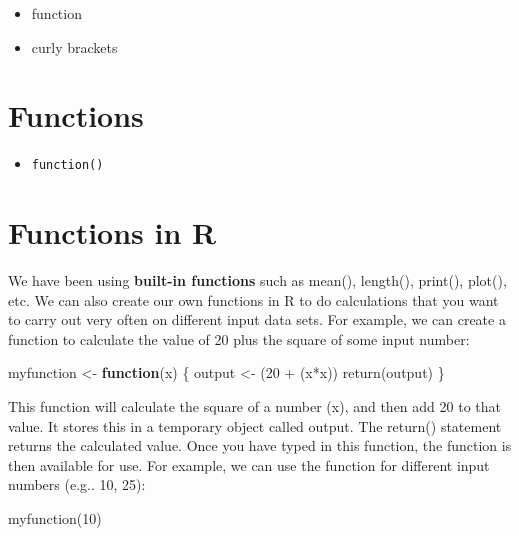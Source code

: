 \documentclass[
]{book}
\newenvironment{Shaded}{\begin{snugshade}}{\end{snugshade}}
\newcommand{\ControlFlowTok}[1]{\textcolor[rgb]{0.13,0.29,0.53}{\textbf{#1}}}
\newcommand{\DecValTok}[1]{\textcolor[rgb]{0.00,0.00,0.81}{#1}}
\newcommand{\FunctionTok}[1]{\textcolor[rgb]{0.00,0.00,0.00}{#1}}
\newcommand{\NormalTok}[1]{#1}
\newcommand{\OtherTok}[1]{\textcolor[rgb]{0.56,0.35,0.01}{#1}}
\newcommand{\SpecialCharTok}[1]{\textcolor[rgb]{0.00,0.00,0.00}{#1}}
\providecommand{\tightlist}{%
  \setlength{\itemsep}{0pt}\setlength{\parskip}{0pt}}
\begin{document}
\begin{itemize}
\tightlist
\item
  function
\item
  curly brackets
\end{itemize}

\hypertarget{functions-2}{%
\section{Functions}\label{functions-2}}

\begin{itemize}
\tightlist
\item
  \texttt{function()}
\end{itemize}

\hypertarget{functions-in-r}{%
\section{Functions in R}\label{functions-in-r}}

We have been using \textbf{built-in functions} such as mean(), length(), print(), plot(), etc. We can also create our own functions in R to do calculations that you want to carry out very often on different input data sets. For example, we can create a function to calculate the value of 20 plus the square of some input number:

\begin{Shaded}
\begin{Highlighting}[]
\NormalTok{myfunction }\OtherTok{\textless{}{-}} \ControlFlowTok{function}\NormalTok{(x) \{ }
\NormalTok{  output }\OtherTok{\textless{}{-}}\NormalTok{ (}\DecValTok{20} \SpecialCharTok{+}\NormalTok{ (x}\SpecialCharTok{*}\NormalTok{x)) }
  \FunctionTok{return}\NormalTok{(output)}
\NormalTok{  \}}
\end{Highlighting}
\end{Shaded}

This function will calculate the square of a number (x), and then add 20 to that value. It stores this in a temporary object called output. The return() statement returns the calculated value. Once you have typed in this function, the function is then available for use. For example, we can use the function for different input numbers (e.g.. 10, 25):

\begin{Shaded}
\begin{Highlighting}[]
\FunctionTok{myfunction}\NormalTok{(}\DecValTok{10}\NormalTok{)}
\end{Highlighting}
\end{Shaded}
\end{document}
